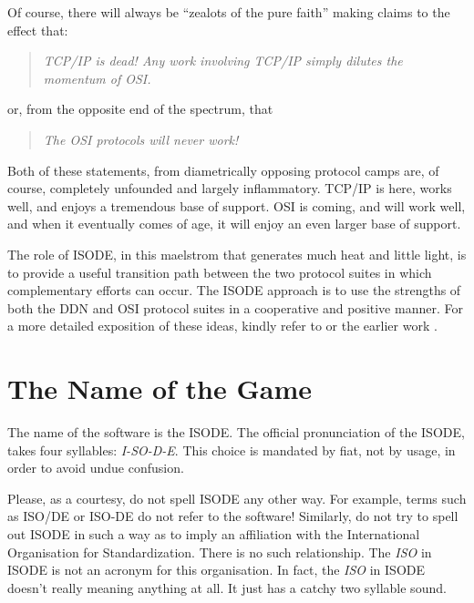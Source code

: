 Of course,
there will always be ``zealots of the pure faith'' making claims to the effect
that:
\begin{quote}\em
TCP/IP is dead!
Any work involving TCP/IP simply dilutes the \mbox{momentum} of OSI.
\end{quote}
or, from the opposite end of the spectrum, that
\begin{quote}\em
The OSI protocols will never work!
\end{quote}
Both of these statements,
from diametrically opposing protocol camps are, of course, completely
unfounded and largely inflammatory.
TCP/IP is here, works well,
and enjoys a tremendous base of support.
OSI is coming, and will work well,
and when it eventually comes of age,
it will enjoy an even larger base of support.

The role of ISODE,
in this maelstrom that generates much heat and little light,
is to provide a useful transition path between the two protocol suites in which
complementary efforts can occur.
The ISODE approach is to use the strengths of both the DDN and OSI protocol
suites in a cooperative and positive manner.
For a more detailed exposition of these ideas,
kindly refer to \cite{Open.Book} or the earlier work \cite{ISO.on.DDN}.

\section	{The Name of the Game}\label{name}
The name of the software is the ISODE.
The official pronunciation of the ISODE,
takes four syllables: {\em I-SO-D-E}.
This choice is mandated by fiat, not by usage,
in order to avoid undue confusion.

Please, as a courtesy, do not spell ISODE any other way.
For example, terms such as ISO/DE or ISO-DE do not refer to the software!
Similarly, do not try to spell out ISODE in such a way as to imply an
affiliation with the International Organisation for Standardization.
There is no such relationship.
The {\em ISO\/} in ISODE is not an acronym for this organisation.
In fact, the {\em ISO\/} in ISODE doesn't really meaning anything at all.
It just has a catchy two syllable sound.

